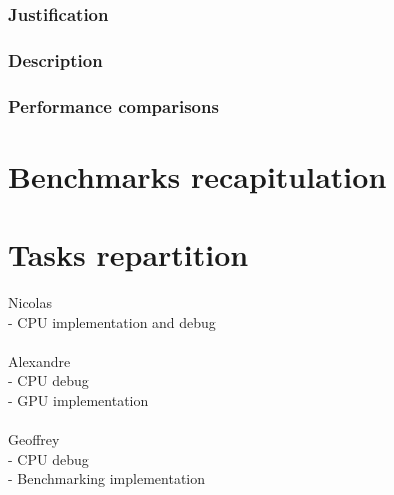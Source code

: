\documentclass{article}
\begin{document}
\subsubsection{Justification}

\subsubsection{Description}

\subsubsection{Performance comparisons}

\section{Benchmarks recapitulation}

\section{Tasks repartition}

\noindent
Nicolas\\
- CPU implementation and debug\\
\\
Alexandre\\
- CPU debug\\
- GPU implementation\\
\\
Geoffrey\\
- CPU debug\\
- Benchmarking implementation
\end{document}
